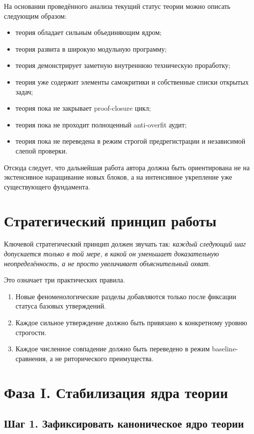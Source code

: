 \documentclass[12pt,a4paper]{article}
\begin{document}
На основании проведённого анализа текущий статус теории можно описать следующим образом:
\begin{itemize}
    \item теория обладает сильным объединяющим ядром;
    \item теория развита в широкую модульную программу;
    \item теория демонстрирует заметную внутреннюю техническую проработку;
    \item теория уже содержит элементы самокритики и собственные списки открытых задач;
    \item теория пока не закрывает proof-closure цикл;
    \item теория пока не проходит полноценный anti-overfit аудит;
    \item теория пока не переведена в режим строгой предрегистрации и независимой слепой проверки.
\end{itemize}

Отсюда следует, что дальнейшая работа автора должна быть ориентирована не на экстенсивное наращивание новых блоков, а на интенсивное укрепление уже существующего фундамента.

\section{Стратегический принцип работы}

Ключевой стратегический принцип должен звучать так: \emph{каждый следующий шаг допускается только в той мере, в какой он уменьшает доказательную неопределённость, а не просто увеличивает объяснительный охват}.

Это означает три практических правила.
\begin{enumerate}
    \item Новые феноменологические разделы добавляются только после фиксации статуса базовых утверждений.
    \item Каждое сильное утверждение должно быть привязано к конкретному уровню строгости.
    \item Каждое численное совпадение должно быть переведено в режим baseline-сравнения, а не риторического преимущества.
\end{enumerate}

\section{Фаза I. Стабилизация ядра теории}

\subsection{Шаг 1. Зафиксировать каноническое ядро теории}
\end{document}
